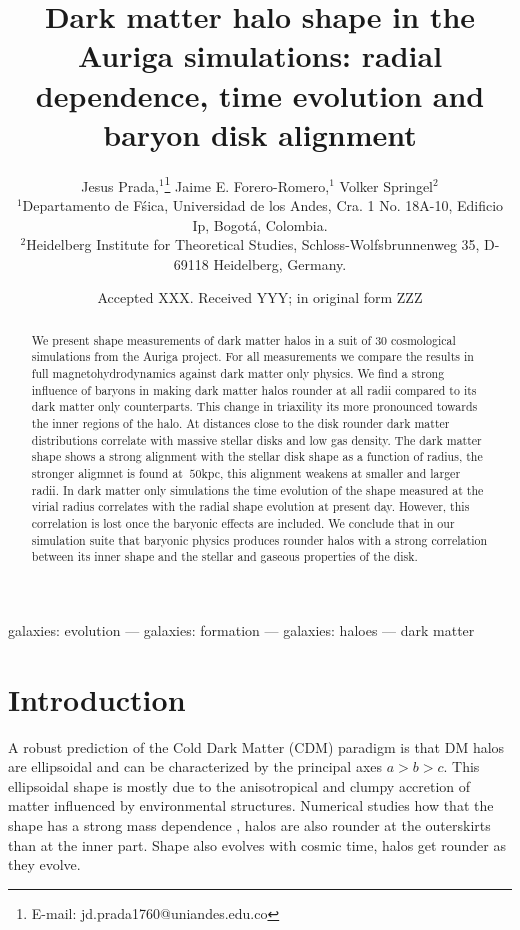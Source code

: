 \documentclass[a4paper,fleqn,usenatbib]{mnras}
\title[The shape of dark matter haloes in the Auriga simulations]
{Dark matter halo shape in the Auriga simulations: radial
  dependence, time evolution and baryon disk alignment}
\author[Jesus Prada,  Jaime E. Forero-Romero, Volker Springel ]{
Jesus Prada,$^{1}$\thanks{E-mail: jd.prada1760@uniandes.edu.co}
Jaime E. Forero-Romero,$^{1}$
Volker Springel$^{2}$
\\
$^{1}$Departamento de F\'sica, Universidad de los Andes, Cra. 1 No.
18A-10, Edificio Ip, Bogot\'a, Colombia.\\
$^{2}$Heidelberg Institute for Theoretical Studies,
Schloss-Wolfsbrunnenweg 35, D-69118 Heidelberg, Germany.\\
}
\date{Accepted XXX. Received YYY; in original form ZZZ}
\begin{document}
\label{firstpage}
\pagerange{\pageref{firstpage}--\pageref{lastpage}}
\maketitle

\begin{abstract}
We present shape measurements of dark matter halos in a suit
of 30 cosmological simulations from the Auriga project.
For all measurements we compare the results in full
magnetohydrodynamics against dark matter only physics.
We find a strong influence of baryons in making dark matter halos rounder at all
radii compared to its dark matter only counterparts.
This change in triaxility its more pronounced towards the inner
regions of the halo.
At distances close to the disk rounder dark matter distributions
correlate with massive stellar disks and low gas density.
The dark matter shape shows a strong alignment with the
stellar disk shape as a function of radius, the stronger aligmnet is
found at $~50$kpc, this alignment weakens at smaller and larger radii. 
In dark matter only simulations the time evolution of the shape
measured at the virial radius correlates with the radial shape
evolution at present day.  
However, this correlation is lost once the baryonic effects are
included. 
We conclude that in our simulation suite that baryonic physics
produces rounder halos with a strong correlation between its inner
shape and the stellar and gaseous properties of the disk.
\end{abstract}

\begin{keywords}
galaxies: evolution --- galaxies: formation --- galaxies: haloes ---
dark matter
\end{keywords}



\section{Introduction}


A robust prediction of the Cold Dark Matter (CDM) paradigm is that DM
halos are ellipsoidal and can be characterized by the principal axes
$a>b>c$.
This ellipsoidal shape is mostly due to the anisotropical and
clumpy accretion of matter influenced by environmental structures.
Numerical studies how that the shape has a strong mass dependence
\citep{Allgood_et_al._2006}, halos are also rounder at the outerskirts
than at the inner part. 
Shape also evolves with cosmic time, halos get
rounder as they evolve.  
\end{document}
